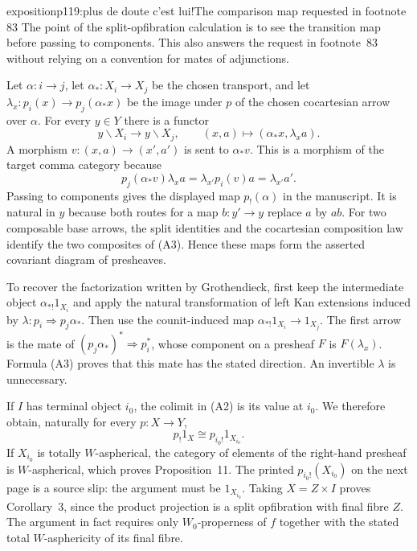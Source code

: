 \begin{dcomment}{exposition}{p119:plus de doute c'est lui!}{The comparison map requested in footnote 83}
The point of the split-opfibration calculation is to see the transition map before passing to components.  This also answers the request in footnote~83 without relying on a convention for mates of adjunctions.

Let $\alpha:i\to j$, let $\alpha_*:X_i\to X_j$ be the chosen transport, and let $\lambda_x:p_i(x)\to p_j(\alpha_*x)$ be the image under $p$ of the chosen cocartesian arrow over $\alpha$.  For every $y\in Y$ there is a functor
\[
 y\backslash X_i\longrightarrow y\backslash X_j,
 \qquad (x,a)\longmapsto(\alpha_*x,\lambda_x a).
 \tag{A3}
\]
A morphism $v:(x,a)\to(x',a')$ is sent to $\alpha_*v$.  This is a morphism of the target comma category because
\[
 p_j(\alpha_*v)\lambda_x a
   =\lambda_{x'}p_i(v)a=\lambda_{x'}a'.
\]
Passing to components gives the displayed map $p_!(\alpha)$ in the manuscript.  It is natural in $y$ because both routes for a map $b:y'\to y$ replace $a$ by $ab$.  For two composable base arrows, the split identities and the cocartesian composition law identify the two composites of (A3).  Hence these maps form the asserted covariant diagram of presheaves.

To recover the factorization written by Grothendieck, first keep the intermediate object $\alpha_{*!}1_{X_i}$ and apply the natural transformation of left Kan extensions induced by $\lambda:p_i\Rightarrow p_j\alpha_*$.  Then use the counit-induced map $\alpha_{*!}1_{X_i}\to1_{X_j}$.  The first arrow is the mate of $(p_j\alpha_*)^*\Rightarrow p_i^*$, whose component on a presheaf $F$ is $F(\lambda_x)$.  Formula (A3) proves that this mate has the stated direction.  An invertible $\lambda$ is unnecessary.

If $I$ has terminal object $i_0$, the colimit in (A2) is its value at $i_0$.  We therefore obtain, naturally for every $p:X\to Y$,
\[
 p_!1_X\cong p_{i_0!}1_{X_{i_0}}.
\]
If $X_{i_0}$ is totally $W$-aspherical, the category of elements of the right-hand presheaf is $W$-aspherical, which proves Proposition~11.  The printed $p_{i_0!}(X_{i_0})$ on the next page is a source slip: the argument must be $1_{X_{i_0}}$.  Taking $X=Z\times I$ proves Corollary~3, since the product projection is a split opfibration with final fibre $Z$.  The argument in fact requires only $W_0$-properness of $f$ together with the stated total $W$-asphericity of its final fibre.
\end{dcomment}

